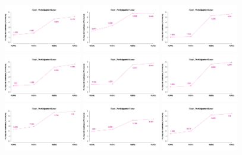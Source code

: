\begin{figure}[th]
\includegraphics[width=0.30\textwidth]{Figures/MirrorRating_Exp1_P10} \includegraphics[width=0.30\textwidth]{Figures/MirrorRating_Exp1_P11} \includegraphics[width=0.30\textwidth]{Figures/MirrorRating_Exp1_P12}
\includegraphics[width=0.30\textwidth]{Figures/MirrorRating_Exp1_P13} \includegraphics[width=0.30\textwidth]{Figures/MirrorRating_Exp1_P14} \includegraphics[width=0.30\textwidth]{Figures/MirrorRating_Exp1_P15}
\includegraphics[width=0.30\textwidth]{Figures/MirrorRating_Exp1_P16} \includegraphics[width=0.30\textwidth]{Figures/MirrorRating_Exp1_P17} \includegraphics[width=0.30\textwidth]{Figures/MirrorRating_Exp1_P18}

\end{figure}
